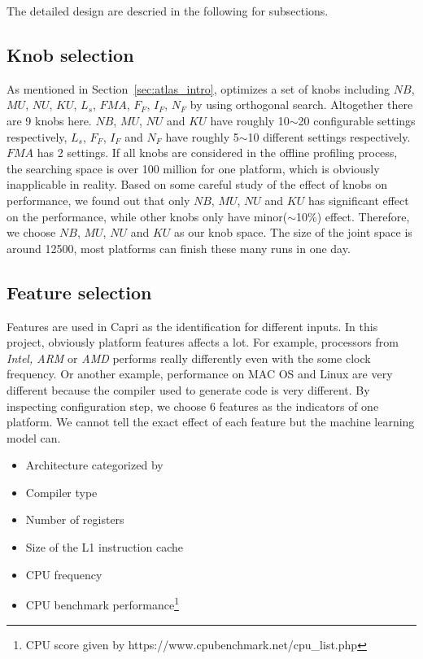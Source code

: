 The detailed design are descried in the following for subsections.

  \subsection{Knob selection}
  \label{sec:knobs}
  As mentioned in Section~\ref{sec:atlas_intro}, \atl optimizes a set of knobs
  including {$NB$, $MU$, $NU$, $KU$, $L_s$, $FMA$, $F_F$, $I_F$, $N_F$} by
  using orthogonal search. Altogether there are 9 knobs here. $NB$, $MU$, $NU$
  and $KU$ have roughly 10$\sim$20 configurable settings respectively, $L_s$,
  $F_F$, $I_F$ and $N_F$ have roughly 5$\sim$10 different settings respectively.
  $FMA$ has 2 settings. If all knobs are considered in the offline profiling
  process, the searching space is over 100 million for one platform, which is
  obviously inapplicable in reality. Based on some careful study of the
  effect of knobs on \gem performance, we found out that only $NB$, $MU$, $NU$
  and $KU$ has significant effect on the performance, while other knobs only
  have minor($\sim$10\%) effect. Therefore, we choose $NB$, $MU$, $NU$ and $KU$
  as our knob space. The size of the joint space is around 12500, most
  platforms can finish these many runs in one day.

  \subsection{Feature selection}
  \label{sec:features}
  Features are used in Capri as the identification for different inputs. In this
  project, obviously platform features affects a lot. For example, processors
  from \emph{Intel, ARM} or \emph{AMD} performs really differently even with
  the some clock frequency. Or another example, performance on MAC OS and Linux
  are very different because the compiler used to generate code is very
  different. By inspecting \atl configuration step, we choose 6 features as the
  indicators of one platform. We cannot tell the exact effect of each feature
  but the machine learning model can.
  \begin{itemize}
  \item Architecture categorized by \atl
  \item Compiler type
  \item Number of registers
  \item Size of the L1 instruction cache
  \item CPU frequency
  \item CPU benchmark performance\footnote{CPU score given by
  https://www.cpubenchmark.net/cpu\_list.php}
  \end{itemize}

